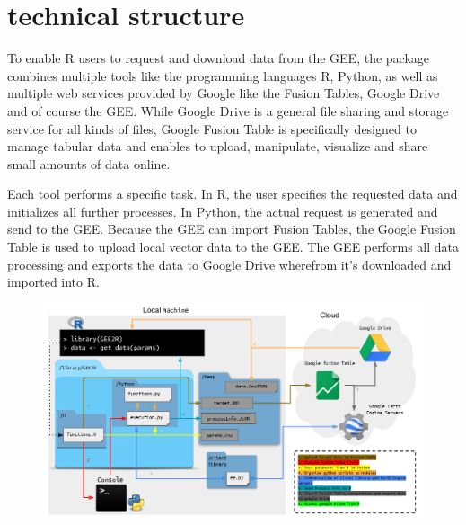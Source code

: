 \documentclass[11pt,twoside,a4paper,final]{report}
\begin{document}
\section{technical structure}

To enable R users to request and download data from the GEE, the package combines multiple tools like the programming languages R, Python, as well as multiple web services provided by Google like the Fusion Tables, Google Drive and of course the GEE. While Google Drive is a general file sharing and storage service for all kinds of files, Google Fusion Table is specifically designed to manage tabular data and enables to upload, manipulate, visualize and share small amounts of data online.
 
Each tool performs a specific task. In R, the user specifies the requested data and initializes all further processes. In Python, the actual request is generated and send to the GEE. Because the GEE can import Fusion Tables, the Google Fusion Table is used to upload local vector data to the GEE. The GEE performs all data processing and exports the data to Google Drive wherefrom it's downloaded and imported into R. 


\begin{center}

   \begin{figure}[h]
     \begin{center}
       \includegraphics[width=15cm]{images/processin_folw.pdf}
    \end{center}
  \end{figure}
\end{center}
\end{document}
